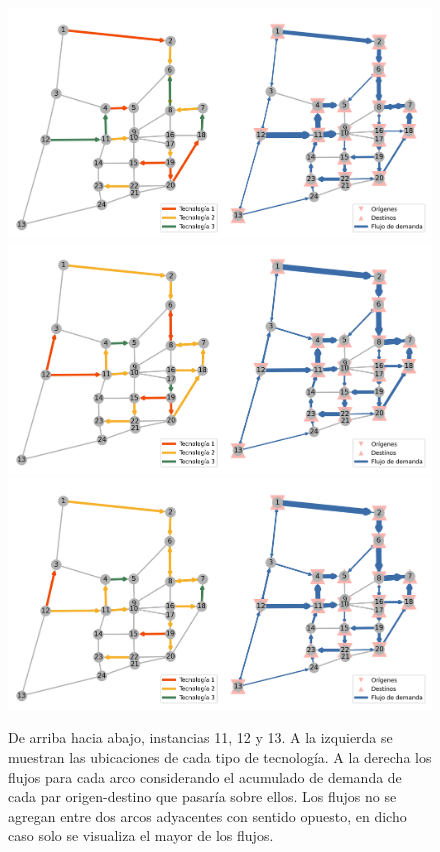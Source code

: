 \begin{figure}[h!]
  \centering
  \includegraphics[width=0.85\linewidth]{../resources/sioux_falls_0.4_budget_factor_linear_5_breakpoints.png}
  \includegraphics[width=0.85\linewidth]{../resources/sioux_falls_0.4_budget_factor_linear_20_breakpoints.png}
  \includegraphics[width=0.85\linewidth]{../resources/sioux_falls_0.4_budget_factor_linear_50_breakpoints.png}
  \caption{De arriba hacia abajo, instancias 11, 12 y 13. A la izquierda se muestran las ubicaciones de cada tipo de tecnología. A la derecha los flujos para cada arco considerando el acumulado de demanda de cada par origen-destino que pasaría sobre ellos. Los flujos no se agregan entre dos arcos adyacentes con sentido opuesto, en dicho caso solo se visualiza el mayor de los flujos.}
  \label{fig:sensibilityinstance11_12_13}
\end{figure}

